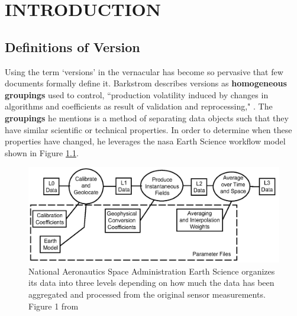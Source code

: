 
\chapter{INTRODUCTION}

\section{Definitions of Version} \label{sec:def}

Using the term `versions' in the vernacular has become so pervasive that few documents formally define it.
Barkstrom describes versions as \textbf{homogeneous groupings} used to control, ``production volatility induced by changes in algorithms and coefficients as result of validation and reprocessing," \cite{Barkstrom2003}.
The \textbf{groupings} he mentions is a method of separating data objects such that they have similar scientific or technical properties.
In order to determine when these properties have changed, he leverages the \gls{nasa} Earth Science workflow model shown in Figure \ref{NASALevels}.
\begin{figure}
	\centering
	\includegraphics[scale=0.35]{figures/NASALevels.png}
	\caption[National Aeronautics and Space Administration Earth Science organizes its data into three levels depending on how much the data has been aggregated and processed from the original sensor measurements.]{National Aeronautics Space Administration Earth Science organizes its data into three levels depending on how much the data has been aggregated and processed from the original sensor measurements. Figure 1 from \cite{Barkstrom2003}}
	\label{NASALevels}
\end{figure}
